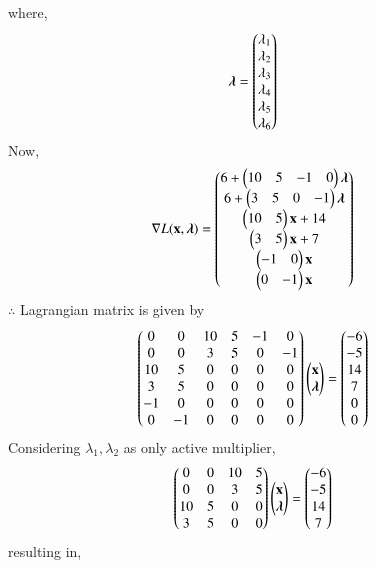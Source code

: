 \documentclass[journal,12pt,twocolumn]{IEEEtran}
\begin{document}
where,
\begin{align}
    \boldsymbol{\lambda} &= \begin{pmatrix}\lambda_1 \\ \lambda_2 \\ \lambda_3 \\ \lambda_4 \\ \lambda_5 \\ \lambda_6\end{pmatrix}
\end{align}
Now,
\begin{align}
    \nabla L(\mathbf{x},\boldsymbol{\lambda}) &= \begin{pmatrix}6+ \begin{pmatrix}10 & 5 & -1 & 0 \end{pmatrix}\boldsymbol{\lambda}\\ 6+\begin{pmatrix}3 & 5 & 0 & -1\end{pmatrix}\boldsymbol{\lambda} \\ \begin{pmatrix}10 & 5\end{pmatrix}\mathbf{x}+14 \\ \begin{pmatrix}3 & 5\end{pmatrix}\mathbf{x}+7 \\ \begin{pmatrix}-1 & 0\end{pmatrix}\mathbf{x} \\ \begin{pmatrix}0 & -1\end{pmatrix}\mathbf{x}\end{pmatrix}
\end{align}
$\therefore$ Lagrangian matrix is given by
\begin{align}
    \begin{pmatrix}0 & 0 & 10 & 5 & -1 & 0 \\ 0 & 0 & 3 & 5 & 0 & -1 \\ 10 & 5 & 0 & 0 & 0 & 0  \\ 3 & 5 & 0 & 0 & 0 & 0  \\ -1 & 0 & 0 & 0 & 0 & 0  \\ 0 & -1 & 0 & 0 & 0 & 0 \end{pmatrix}\begin{pmatrix}\mathbf{x} \\ \boldsymbol{\lambda} \end{pmatrix} &= \begin{pmatrix}-6 \\ -5 \\ 14 \\ 7 \\ 0 \\0 \end{pmatrix}
\end{align}
Considering $\lambda_1,\lambda_2$ as only active multiplier,
\begin{align}
    \begin{pmatrix}0 & 0 & 10 & 5 \\ 0 & 0 & 3 & 5 \\ 10 & 5 & 0 & 0 \\ 3 & 5 & 0 & 0\end{pmatrix}\begin{pmatrix}\mathbf{x}\\ \boldsymbol{\lambda}\end{pmatrix} &=\begin{pmatrix}-6 \\ -5 \\ 14 \\ 7\end{pmatrix}
\end{align}
resulting in,
\end{document}
